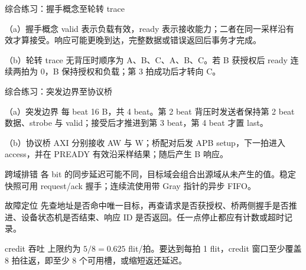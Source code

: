 \begin{chapteranswer}{综合练习：握手概念至轮转 trace}
\begin{answersubproblem}{（a）握手概念}
valid 表示负载有效，ready 表示接收能力；二者在同一采样沿有效才算接受。响应可能更晚到达，完整数据或错误返回后事务才完成。
\end{answersubproblem}
\begin{answersubproblem}{（b）轮转 trace}
无背压时顺序为 A、B、C、A、B、C。若 B 获授权后 ready 连续两拍为 0，B 保持授权和负载；第 3 拍成功后才转向 C。
\end{answersubproblem}
\end{chapteranswer}

\begin{chapteranswer}{综合练习：突发边界至协议桥}
\begin{answersubproblem}{（a）突发边界}
每 beat 16 B，共 4 beat。第 2 beat 背压时发送者保持第 2 beat 数据、strobe 与 valid；接受后才推进到第 3 beat，第 4 beat 才置 last。
\end{answersubproblem}
\begin{answersubproblem}{（b）协议桥}
AXI 分别接收 AW 与 W；桥配对后发 APB setup，下一拍进入 access，并在 PREADY 有效沿采样结果；随后产生 B 响应。
\end{answersubproblem}
\end{chapteranswer}

\begin{chapteranswer}{跨域排错}
各 bit 的同步延迟可能不同，目标域会组合出源域从未产生的值。稳定快照可用 request/ack 握手；连续流使用带 Gray 指针的异步 FIFO。
\end{chapteranswer}

\begin{chapteranswer}{故障定位}
先查地址是否命中唯一目标，再查请求是否获授权、桥两侧握手是否推进、设备状态机是否结束、响应 ID 是否返回。任一点停止都应有计数或超时记录。
\end{chapteranswer}

\begin{chapteranswer}{credit 吞吐}
上限约为 $5/8=0.625$ flit/拍。要达到每拍 1 flit，credit 窗口至少覆盖 8 拍往返，即至少 8 个可用槽，或缩短返还延迟。
\end{chapteranswer}

